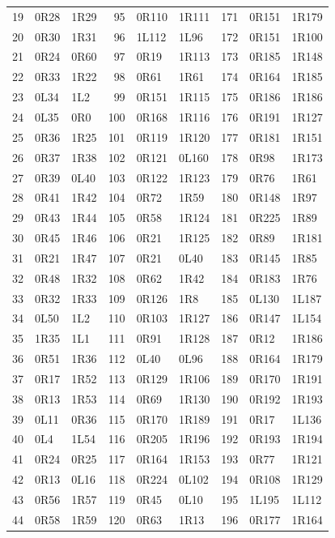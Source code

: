 \begin{longtable}{@{}rll@{\hspace{7mm}}rll@{\hspace{7mm}}rll@{}}
19 & 0R28 & 1R29 & 95 & 0R110 & 1R111 & 171 & 0R151 & 1R179\\
20 & 0R30 & 1R31 & 96 & 1L112 & 1L96 & 172 & 0R151 & 1R100\\
21 & 0R24 & 0R60 & 97 & 0R19 & 1R113 & 173 & 0R185 & 1R148\\
22 & 0R33 & 1R22 & 98 & 0R61 & 1R61 & 174 & 0R164 & 1R185\\
23 & 0L34 & 1L2 & 99 & 0R151 & 1R115 & 175 & 0R186 & 1R186\\
24 & 0L35 & 0R0 & 100 & 0R168 & 1R116 & 176 & 0R191 & 1R127\\
25 & 0R36 & 1R25 & 101 & 0R119 & 1R120 & 177 & 0R181 & 1R151\\
26 & 0R37 & 1R38 & 102 & 0R121 & 0L160 & 178 & 0R98 & 1R173\\
27 & 0R39 & 0L40 & 103 & 0R122 & 1R123 & 179 & 0R76 & 1R61\\
28 & 0R41 & 1R42 & 104 & 0R72 & 1R59 & 180 & 0R148 & 1R97\\
29 & 0R43 & 1R44 & 105 & 0R58 & 1R124 & 181 & 0R225 & 1R89\\
30 & 0R45 & 1R46 & 106 & 0R21 & 1R125 & 182 & 0R89 & 1R181\\
31 & 0R21 & 1R47 & 107 & 0R21 & 0L40 & 183 & 0R145 & 1R85\\
32 & 0R48 & 1R32 & 108 & 0R62 & 1R42 & 184 & 0R183 & 1R76\\
33 & 0R32 & 1R33 & 109 & 0R126 & 1R8 & 185 & 0L130 & 1L187\\
34 & 0L50 & 1L2 & 110 & 0R103 & 1R127 & 186 & 0R147 & 1L154\\
35 & 1R35 & 1L1 & 111 & 0R91 & 1R128 & 187 & 0R12 & 1R186\\
36 & 0R51 & 1R36 & 112 & 0L40 & 0L96 & 188 & 0R164 & 1R179\\
37 & 0R17 & 1R52 & 113 & 0R129 & 1R106 & 189 & 0R170 & 1R191\\
38 & 0R13 & 1R53 & 114 & 0R69 & 1R130 & 190 & 0R192 & 1R193\\
39 & 0L11 & 0R36 & 115 & 0R170 & 1R189 & 191 & 0R17 & 1L136\\
40 & 0L4 & 1L54 & 116 & 0R205 & 1R196 & 192 & 0R193 & 1R194\\
41 & 0R24 & 0R25 & 117 & 0R164 & 1R153 & 193 & 0R77 & 1R121\\
42 & 0R13 & 0L16 & 118 & 0R224 & 0L102 & 194 & 0R108 & 1R129\\
43 & 0R56 & 1R57 & 119 & 0R45 & 0L10 & 195 & 1L195 & 1L112\\
44 & 0R58 & 1R59 & 120 & 0R63 & 1R13 & 196 & 0R177 & 1R164\\

\end{longtable}
